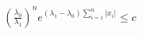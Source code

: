 \documentclass[preview]{standalone}
\begin{document}
\begin{align*}
\left(\frac{\lambda_0}{\lambda_1}\right)^n e^{(\lambda_1-\lambda_0)\sum_{i=1}^n |x_i|} \leq c
\end{align*}
\end{document}
